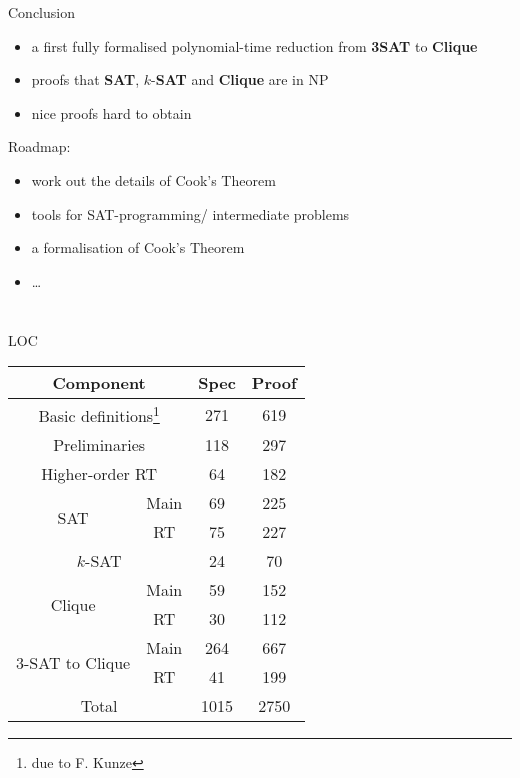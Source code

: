 \documentclass[11pt,usenames,dvipsnames,
  hyperref={pdfencoding=auto,psdextra}]{beamer}
\makeatletter
\def\beamer@writeslidentry@miniframesoff{%
  \expandafter\beamer@ifempty\expandafter{\beamer@framestartpage}{}%
  {%
    \clearpage\beamer@notesactions%
  }
}
\newcommand*{\miniframesoff}{\let\beamer@writeslidentry=\beamer@writeslidentry@miniframesoff}
\makeatother
\begin{document}
\begin{frame}{Conclusion}
  \begin{itemize}
    \item a first fully formalised polynomial-time reduction from \textbf{3SAT} to \textbf{Clique}
    \item proofs that \textbf{SAT}, $k$-\textbf{SAT} and \textbf{Clique} are in NP
    \item nice proofs hard to obtain
  \end{itemize}

  \vspace{5ex}

  Roadmap:
  \begin{itemize}
    \item work out the details of Cook's Theorem
    \item tools for SAT-programming/ intermediate problems
    \item a formalisation of Cook's Theorem
    \item \ldots 
  \end{itemize}
\end{frame}

\miniframesoff
\section{}


\begin{frame}{LOC}
  \begin{center}
  \begin{tabular}{cccc}
    \multicolumn{2}{c}{Component} & Spec & Proof \\
    \midrule
    \multicolumn{2}{c}{Basic definitions\footnote{due to F. Kunze}} & 271 & 619\\
    \multicolumn{2}{c}{Preliminaries} & 118 & 297 \\
    \multicolumn{2}{c}{Higher-order RT} & 64 & 182 \\
    \midrule
    \multirow{2}{*}{SAT} & Main & 69 & 225 \\
    & RT & 75 & 227 \\
    \midrule
    \multicolumn{2}{c}{$k$-SAT} & 24 & 70 \\
    \midrule
    \multirow{2}{*}{Clique} & Main & 59 & 152 \\
    & RT & 30 & 112 \\
    \midrule
    \multirow{2}{*}{3-SAT to Clique} & Main & 264 & 667 \\
    & RT & 41 & 199\\
    \midrule
    \multicolumn{2}{c}{Total} & 1015 & 2750

  \end{tabular}
  \end{center}
\end{frame}
\end{document}
